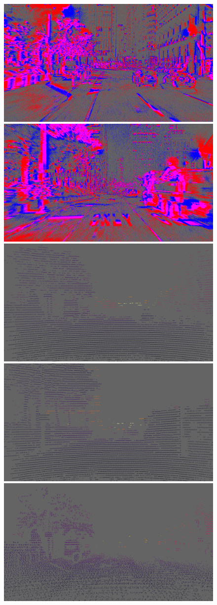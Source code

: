 \begin{figure}
  \centering
  \includegraphics[width=0.4325\linewidth]{mainmatter/figures/c_depth_transf/m3ed_dense_cmp_additional/evts002995_lightgray_fixed.png}
  \includegraphics[width=0.4325\linewidth]{mainmatter/figures/c_depth_transf/m3ed_dense_cmp_additional/evts005472_lightgray_fixed.png}\\
  \includegraphics[width=0.4325\linewidth]{mainmatter/figures/c_depth_transf/m3ed_dense_cmp_additional/lidar002995_lightgray_fixed.png}
  \includegraphics[width=0.4325\linewidth]{mainmatter/figures/c_depth_transf/m3ed_dense_cmp_additional/lidar005472_lightgray_fixed.png}\\
  \includegraphics[width=0.4325\linewidth]{mainmatter/figures/c_depth_transf/m3ed_dense_cmp_additional/gtbf002995_lightgray_fixed.png}

\end{figure}
